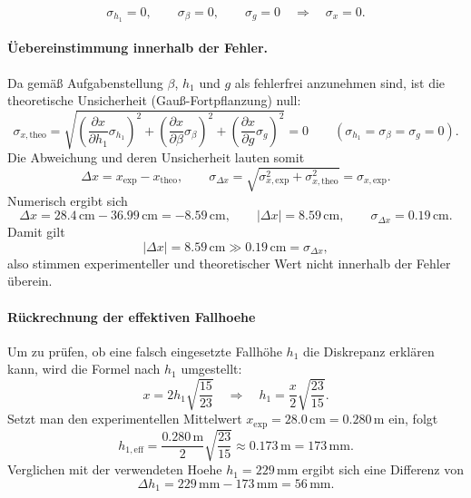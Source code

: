 \documentclass{article}
\begin{document}
\begin{equation}
\sigma_{h_1}=0,\qquad \sigma_{\beta}=0,\qquad \sigma_{g}=0
\quad\Longrightarrow\quad
\sigma_x = 0.
\end{equation}


\paragraph{Üebereinstimmung innerhalb der Fehler.}
Da gemäß Aufgabenstellung $\beta$, $h_1$ und $g$ als fehlerfrei anzunehmen sind,
ist die theoretische Unsicherheit (Gau{\ss}-Fortpflanzung) null:
\begin{equation}
\sigma_{x,\mathrm{theo}}
= \sqrt{\left(\frac{\partial x}{\partial h_1}\sigma_{h_1}\right)^2
      +\left(\frac{\partial x}{\partial \beta}\sigma_{\beta}\right)^2
      +\left(\frac{\partial x}{\partial g}\sigma_{g}\right)^2}
=0
\qquad(\sigma_{h_1}=\sigma_\beta=\sigma_g=0).
\end{equation}
Die Abweichung und deren Unsicherheit lauten somit
\begin{equation}
\Delta x = x_\mathrm{exp}-x_\mathrm{theo},
\qquad
\sigma_{\Delta x}=\sqrt{\sigma_{x,\mathrm{exp}}^2+\sigma_{x,\mathrm{theo}}^2}
=\sigma_{x,\mathrm{exp}}.
\end{equation}
Numerisch ergibt sich
\begin{equation}
\Delta x = 28.4\,\mathrm{cm}-36.99\,\mathrm{cm}=-8.59\,\mathrm{cm},
\qquad
|\Delta x|=8.59\,\mathrm{cm},
\qquad
\sigma_{\Delta x}=0.19\,\mathrm{cm}.
\end{equation}
Damit gilt
\begin{equation}
|\Delta x| = 8.59\,\mathrm{cm} \gg 0.19\,\mathrm{cm}=\sigma_{\Delta x},
\end{equation}
also stimmen experimenteller und theoretischer Wert nicht innerhalb der Fehler überein.

\paragraph{Rückrechnung der effektiven Fallhoehe}
Um zu prüfen, ob eine falsch eingesetzte Fallhöhe $h_1$ die Diskrepanz erklären kann,
wird die Formel nach $h_1$ umgestellt:
\begin{equation}
x = 2h_1\sqrt{\frac{15}{23}}
\quad\Longrightarrow\quad
h_1 = \frac{x}{2}\sqrt{\frac{23}{15}}.
\end{equation}
Setzt man den experimentellen Mittelwert $x_\mathrm{exp}=28.0\,\mathrm{cm}=0.280\,\mathrm{m}$ ein, folgt
\begin{equation}
h_{1,\mathrm{eff}}
= \frac{0.280\,\mathrm{m}}{2}\sqrt{\frac{23}{15}}
\approx 0.173\,\mathrm{m}
=173\,\mathrm{mm}.
\end{equation}
Verglichen mit der verwendeten Hoehe $h_1=229\,\mathrm{mm}$ ergibt sich eine Differenz von
\begin{equation}
\Delta h_1 = 229\,\mathrm{mm}-173\,\mathrm{mm}=56\,\mathrm{mm}.
\end{equation}
\end{document}

